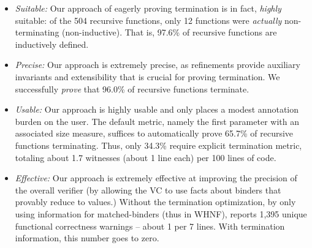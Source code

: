 \begin{itemize}
  \item{\emph{Suitable:}} Our approach of eagerly proving termination is in
    fact, \emph{highly} suitable: of the %
    504 recursive functions, only 12 functions were \emph{actually}
    non-terminating (\ie non-inductive).
    That is, 97.6\% of recursive functions 
    are inductively defined.

  \item{\emph{Precise:}} Our approach is extremely precise, as refinements
    provide auxiliary invariants and extensibility that is crucial for 
    proving termination. We successfully \emph{prove} that 96.0\% of 
    recursive functions %
    terminate. 

  \item{\emph{Usable:}} Our approach is highly usable and only places a 
    modest annotation burden on the user. The default metric, namely the first 
    parameter with an associated size measure, suffices to automatically 
    prove 65.7\% of recursive functions terminating. Thus, only 34.3\% require 
    explicit termination metric, totaling about 1.7 witnesses (about 1 line
    each) per 100 lines of code.

  \item{\emph{Effective:}} Our approach is extremely effective at improving the
    precision of the overall verifier (by allowing the VC to use facts
    about binders that provably reduce to values.) 
    Without the termination optimization, \ie by only using information 
    for matched-binders (thus in WHNF), \toolname reports 1,395 
    unique functional correctness warnings -- about 1 per 7 lines.
    With termination information, this number goes to zero.
\end{itemize}



